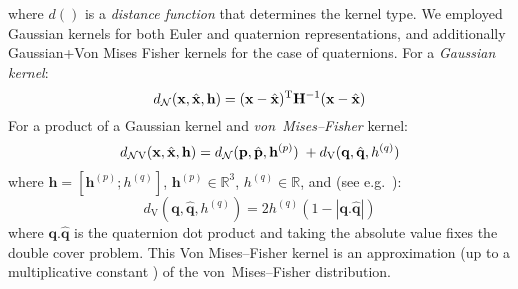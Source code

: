 \noindent where $d()$ is a \textit{distance function} that determines the kernel type. We employed Gaussian kernels for both Euler and quaternion representations, and additionally Gaussian+Von Mises Fisher kernels for the case of quaternions. For a \textit{Gaussian kernel}:
\begin{equation}
d_\mathrm{\mathcal{N}}(\bx, \hat{\bx}, \mathbf{h}) =
(\bx - \hat{\bx})^\mathrm{T}\mathbf{H}^{-1}(\bx - \hat{\bx})
\label{eq:Density.Estimation.gaussiandist}
\end{equation}
For a product of a Gaussian kernel and \textit{von~Mises--Fisher} kernel:
\begin{multline}
d_\mathrm{\mathcal{N}V}(\bx, \hat{\bx}, \mathbf{h}) =
d_\mathrm{\mathcal{N}}(\mathbf{p}, \hat{\mathbf{p}}, \mathbf{h}^{(p)}) \; + d_\mathrm{V}(\mathbf{q}, \hat{\mathbf{q}}, h^{(q)})
\label{eq:Density.Estimation.gaussvmfdist}
\end{multline}
\noindent where %
$\mathbf{h} = \left[ \mathbf{h}^{(p)} ; h^{(q)} \right]$,
$\mathbf{h}^{(p)} \in \mathbb{R}^3$,
$h^{(q)} \in \mathbb{R}$,
and (see e.g.\ \cite{abramowitz_handbook_1965}):
\begin{equation}
d_\mathrm{V}(\mathbf{q}, \hat{\mathbf{q}}, h^{(q)}) =
2 h^{(q)} \left(1 - \left| \mathbf{q} . \hat{\mathbf{q}} \right|\right)
\label{eq:Density.Estimation.vmfdist}
\end{equation}
\noindent where $\mathbf{q} . \hat{\mathbf{q}}$ is the quaternion dot product and taking the absolute value fixes the double cover problem. This Von Mises--Fisher kernel is an approximation (up to a multiplicative constant \cite{detry_learning_2010}) of the von~Mises--Fisher distribution.


